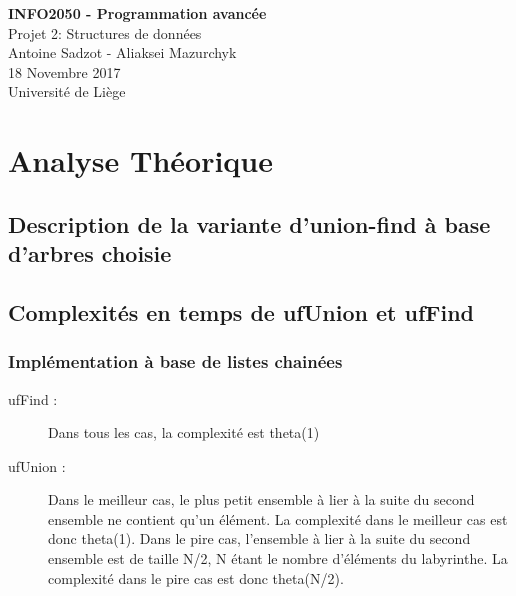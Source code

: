 \documentclass[11pt]{article}
\begin{document}
\begin{titlepage}

   \begin{figure}[htbp]
      \centering
   \end{figure}
  	
  	\hfill

	\begin{center}
		\vfill
		\textbf{
		\Huge{INFO2050 - Programmation avancée}}\\
		\bigskip
		\huge{Projet 2: Structures de données}\\
		\bigskip %
		\smallskip
		\Large{Antoine Sadzot - Aliaksei Mazurchyk} \\
		\bigskip
		\smallskip
		\large{18 Novembre 2017}\\%
		\vfill
		\large{Université de Liège}
	\end{center}
\end{titlepage}
\clearpage
\clearpage

\section{Analyse Théorique}
\subsection{Description de la variante d'union-find à base d'arbres choisie}


\subsection{Complexités en temps de ufUnion et ufFind}

\subsubsection{Implémentation à base de listes chainées}

\begin{description}
\item[ufFind :] Dans tous les cas, la complexité est theta(1)
\item[ufUnion :] Dans le meilleur cas, le plus petit ensemble à lier à la suite du second ensemble ne contient qu'un élément. La complexité dans le meilleur cas est donc theta(1). Dans le pire cas, l'ensemble à lier à la suite du second ensemble est de taille N/2, N étant le nombre d'éléments du labyrinthe. La complexité dans le pire cas est donc theta(N/2).
\end{description}
\end{document}
